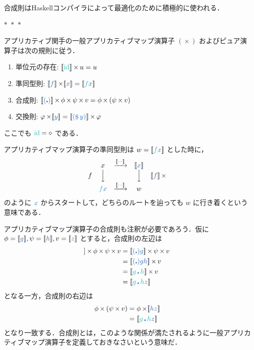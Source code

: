 \documentclass[a5paper,twoside,fleqn,draft]{jsbook}
\def\[{[\![}
\def\]{]\!]}
\def\varColor{NavyBlue}
\def\funcColor{BlueGreen}
\newcommand{\separator}{\begin{center}$*$~$*$~$*$\end{center}}
\newcommand{\programminglanguage}[1]{\textsf{#1}}
\newcommand{\haskell}{\programminglanguage{Haskell}}
\newcommand{\mVar}[1]{\textcolor{\varColor}{#1}}
\newcommand{\mAnonParam}{\diamond}
\newcommand{\mXVar}{\mVar{x}}
\newcommand{\mZVar}{\mVar{z}}
\newcommand{\mFunc}[1]{\textcolor{\funcColor}{#1}}
\newcommand{\mSpecialFunc}[1]{\textcolor{\funcColor}{\textrm{#1}}}
\newcommand{\mFFunc}{{\mFunc{f}}}
\newcommand{\mGFunc}{\mFunc{g}}
\newcommand{\mHFunc}{\mFunc{h}}
\DeclareMathOperator{\mId}{\mSpecialFunc{id}}
\DeclareMathOperator{\mApply}{\$}
\DeclareMathOperator{\mAppMap}{\times}
\DeclareMathOperator{\mCompFunc}{\centerdot}
\DeclareMathOperator{\mMap}{\cdot}
\newcommand{\mPureWith}[1]{\[\mVar{#1}\]}
\begin{document}
合成則は\haskell コンパイラによって最適化のために積極的に使われる．

\separator

アプリカティブ関手の一般アプリカティブマップ演算子 $(\mAppMap)$ およびピュア演算子は次の規則に従う．
\begin{enumerate}
\item 単位元の存在: $\mPureWith{\mId}\mAppMap u=u$
\item 準同型則: $\mPureWith{f}\mAppMap\mPureWith{x}=\mPureWith{\mFFunc\mXVar}$
\item 合成則: $\mPureWith{(\mCompFunc)}\mAppMap\phi\mAppMap\psi\mAppMap v=\phi\mAppMap{}(\psi\mAppMap v)$
\item 交換則: $\varphi\mAppMap\mPureWith{y}=\mPureWith{(\mApply y)}\mAppMap\varphi$
\end{enumerate}
ここでも $\mId=\mAnonParam$ である．

アプリカティブマップ演算子の準同型則は $w=\mPureWith{\mFFunc\mXVar}$ とした時に，
\begin{equation}
\begin{matrix}
&x&\xrightarrow{\mPureWith{\dotsb}}&\mPureWith{x}\\
f&\Big\downarrow&&\Big\downarrow&\mPureWith{f}\mAppMap\\
&\mFFunc\mXVar&\xrightarrow{\mPureWith{\dotsb}}&w
\end{matrix}
\end{equation}
のように $\mXVar$ からスタートして，どちらのルートを辿っても $w$ に行き着くという意味である．

アプリカティブマップ演算子の合成則も注釈が必要であろう．仮に $\phi=\mPureWith{g},\psi=\mPureWith{h},v=\mPureWith{z}$ とすると，合成則の左辺は
\begin{align}
\mPureWith{(\mCompFunc)}\mAppMap\phi\mAppMap\psi\mAppMap v
&=\mPureWith{(\mCompFunc)g}\mAppMap\psi\mAppMap v\\
&=\mPureWith{(\mCompFunc)gh}\mAppMap v\\
&=\mPureWith{\mGFunc\mCompFunc\mHFunc}\mAppMap v\\
&=\mPureWith{\mGFunc\mCompFunc\mHFunc\mZVar}
\end{align}
となる一方，合成則の右辺は
\begin{align}
\phi\mAppMap{}(\psi\mAppMap v)
&=\phi\mAppMap\mPureWith{hz}\\
&=\mPureWith{\mGFunc\mCompFunc\mHFunc\mZVar}
\end{align}
となり一致する．合成則とは，このような関係が満たされるように一般アプリカティブマップ演算子を定義しておきなさいという意味だ．
\end{document}
